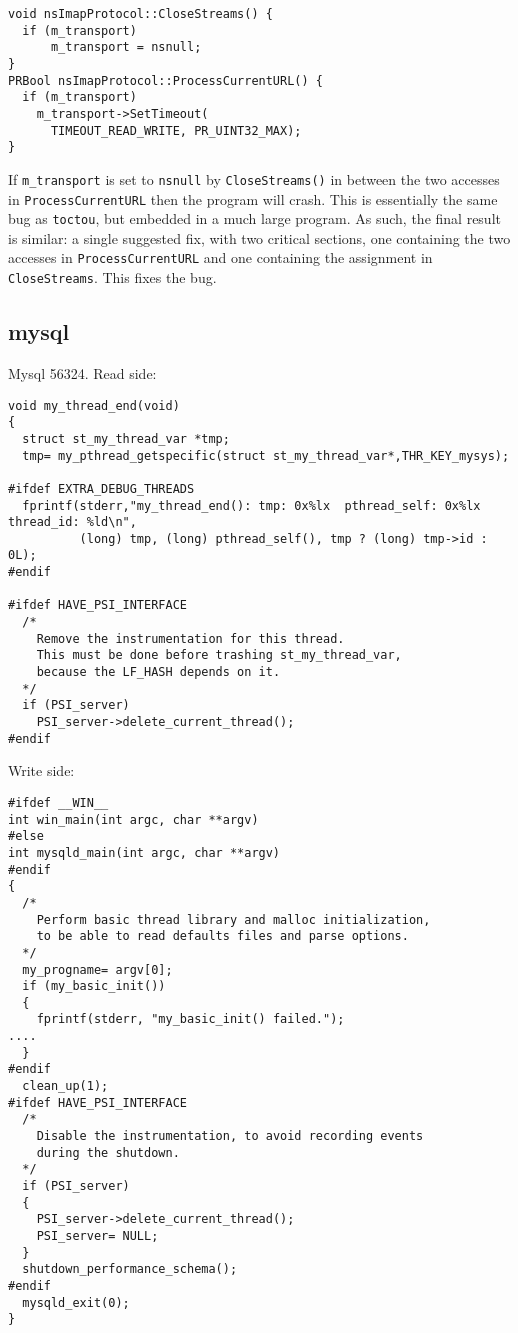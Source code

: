 \begin{verbatim}
void nsImapProtocol::CloseStreams() {
  if (m_transport)
      m_transport = nsnull;
}
PRBool nsImapProtocol::ProcessCurrentURL() {
  if (m_transport)
    m_transport->SetTimeout(
      TIMEOUT_READ_WRITE, PR_UINT32_MAX);
}
\end{verbatim}

\noindent
If \verb|m_transport| is set to \verb|nsnull| by \verb|CloseStreams()|
in between the two accesses in \verb|ProcessCurrentURL| then the
program will crash.  This is essentially the same bug as
\verb|toctou|, but embedded in a much large program.  As such, the
final result is similar: a single suggested fix, with two critical
sections, one containing the two accesses in \verb|ProcessCurrentURL|
and one containing the assignment in \verb|CloseStreams|.  This fixes
the bug.

\subsection{mysql}

Mysql 56324.  Read side:

\begin{verbatim}
void my_thread_end(void)
{
  struct st_my_thread_var *tmp;
  tmp= my_pthread_getspecific(struct st_my_thread_var*,THR_KEY_mysys);

#ifdef EXTRA_DEBUG_THREADS
  fprintf(stderr,"my_thread_end(): tmp: 0x%lx  pthread_self: 0x%lx  thread_id: %ld\n",
          (long) tmp, (long) pthread_self(), tmp ? (long) tmp->id : 0L);
#endif

#ifdef HAVE_PSI_INTERFACE
  /*
    Remove the instrumentation for this thread.
    This must be done before trashing st_my_thread_var,
    because the LF_HASH depends on it.
  */
  if (PSI_server)
    PSI_server->delete_current_thread();
#endif
\end{verbatim}

Write side:

\begin{verbatim}
#ifdef __WIN__
int win_main(int argc, char **argv)
#else
int mysqld_main(int argc, char **argv)
#endif
{
  /*
    Perform basic thread library and malloc initialization,
    to be able to read defaults files and parse options.
  */
  my_progname= argv[0];
  if (my_basic_init())
  {
    fprintf(stderr, "my_basic_init() failed.");
....
  }
#endif
  clean_up(1);
#ifdef HAVE_PSI_INTERFACE
  /*
    Disable the instrumentation, to avoid recording events
    during the shutdown.
  */
  if (PSI_server)
  {
    PSI_server->delete_current_thread();
    PSI_server= NULL;
  }
  shutdown_performance_schema();
#endif
  mysqld_exit(0);
}
\end{verbatim}

